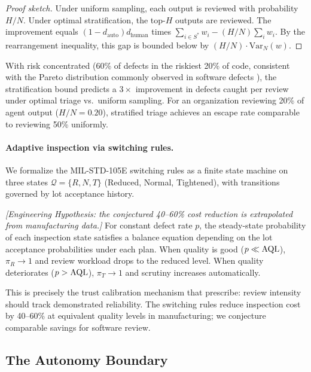 \begin{proof}[Proof sketch]
Under uniform sampling, each output is reviewed with probability $H/N$. Under optimal stratification, the top-$H$ outputs are reviewed. The improvement equals $(1 - d_{\text{auto}}) d_{\text{human}}$ times $\sum_{i \in S^*} w_i - (H/N)\sum_i w_i$. By the rearrangement inequality, this gap is bounded below by $(H/N) \cdot \text{Var}_N(w)$.
\end{proof}

With risk concentrated (60\% of defects in the riskiest 20\% of code, consistent with the Pareto distribution commonly observed in software defects \citep{jones1996software}), the stratification bound predicts a $3\times$ improvement in defects caught per review under optimal triage vs.\ uniform sampling. For an organization reviewing 20\% of agent output ($H/N = 0.20$), stratified triage achieves an escape rate comparable to reviewing 50\% uniformly.

\paragraph{Adaptive inspection via switching rules.} We formalize the MIL-STD-105E switching rules \citep{milstd105e} as a finite state machine on three states $\mathcal{Q} = \{R, N, T\}$ (Reduced, Normal, Tightened), with transitions governed by lot acceptance history.

\begin{proposition}
\emph{[Engineering Hypothesis: the conjectured 40--60\% cost reduction is extrapolated from manufacturing data.]}
\label{prop:steady-state}
For constant defect rate $p$, the steady-state probability of each inspection state satisfies a balance equation depending on the lot acceptance probabilities under each plan. When quality is good ($p \ll \textup{AQL}$), $\pi_R \to 1$ and review workload drops to the reduced level. When quality deteriorates ($p > \textup{AQL}$), $\pi_T \to 1$ and scrutiny increases automatically.
\end{proposition}

This is precisely the trust calibration mechanism that \citet{lee2004trust} prescribe: review intensity should track demonstrated reliability. The switching rules reduce inspection cost by 40--60\% at equivalent quality levels in manufacturing; we conjecture comparable savings for software review.

\subsection{The Autonomy Boundary}

